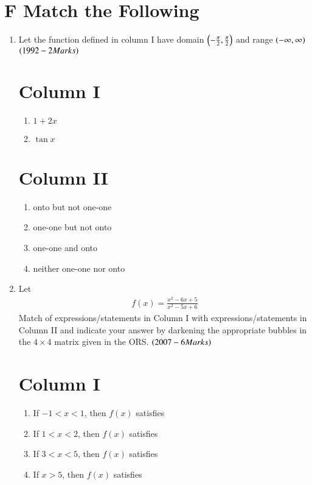 \documentclass[journal,12pt,twocolumn,article]{IEEEtran}
\theoremstyle{remark}
\begin{document}
	\section*{F Match the Following}
	\begin{enumerate}
		\item Let the function defined in column I have domain $\left(-\frac{\pi}{2},\frac{\pi}{2}\right)$ and range $\left(-\infty,\infty\right)$ \hfill${\left(1992-2 Marks\right)}$
			\begin{multicols}{2} 
				\section*{Column I}
				\begin{enumerate}[label=(\Alph*)]
					\item $1+2x$
					\item $\tan x$
				\end{enumerate}
				\columnbreak
				 \section*{Column II}
				\begin{enumerate}[label=(\alph*),start=16]
					\item onto but not one-one
					\item one-one but not onto
					\item one-one and onto
					\item neither one-one nor onto
				\end{enumerate}
			\end{multicols}
				\item Let 
					\begin{align*}
						f(x)=\frac{x^2-6x+5}{x^2-5x+6}
					\end{align*}
					 Match of expressions/statements in Column I with expressions/statements in Column II and indicate your answer by darkening the appropriate bubbles in the $4\times4$ matrix given in the ORS. \hfill{$\left(2007-6 Marks\right)$}
	
			              \begin{multicols}{2}
					      \section*{ Column I}
						\begin{enumerate}[label=(\Alph*)]
							\item If $-1<x<1$, then $f(x)$ satisfies
							\item If $1<x<2$, then $f(x)$ satisfies
							\item If $3<x<5$, then $f(x)$ satisfies
							\item If $x>5$, then $f(x)$ satisfies
						\end{enumerate}
						\columnbreak

\end{multicols}
\end{enumerate}
\end{document}
